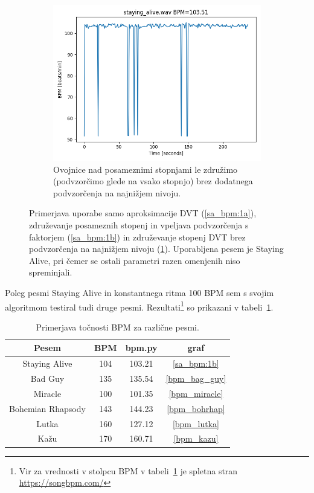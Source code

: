 \documentclass[a4paper,11pt]{article}
\begin{document}
\begin{figure}
\begin{subfigure}{0.48\textwidth}
\centering
\includegraphics[width=\linewidth]{images/sa_bpm_multiple_nosubs.png}
\caption{Ovojnice nad posameznimi stopnjami le združimo (podvzorčimo glede na vsako stopnjo) brez dodatnega podvzorčenja na najnižjem nivoju.} \label{sa_bpm:1c}
\end{subfigure}

\caption{Primerjava uporabe samo aproksimacije DVT (\ref{sa_bpm:1a}), združevanje posameznih stopenj in vpeljava podvzorčenja s faktorjem (\ref{sa_bpm:1b}) in združevanje stopenj DVT brez podvzorčenja na najnižjem nivoju (\ref{sa_bpm:1c}). Uporabljena pesem je Staying Alive, pri čemer se ostali parametri razen omenjenih niso spreminjali.} \label{sa_bpm_cmp}
\end{figure}


Poleg pesmi Staying Alive in konstantnega ritma 100 BPM sem s svojim algoritmom testiral tudi druge pesmi. Rezultati\footnote{Vir za vrednosti v stolpcu BPM v tabeli~\ref{tab:rezultati} je spletna stran \url{https://songbpm.com/}} so prikazani v tabeli~\ref{tab:rezultati}.

\begin{table}[!htpb]
\centering
\renewcommand{\arraystretch}{1.5}
 \begin{tabular}{||c c c c||} 
 \hline
 Pesem & BPM & bpm.py & graf \\ [0.5ex]
 \hline \hline
 Staying Alive & 104 & {\Large 103.21} & \ref{sa_bpm:1b} \\
 Bad Guy & 135 & {\Large 135.54 } & \ref{bpm_bag_guy} \\
 Miracle & 100 & {\Large 101.35} & \ref{bpm_miracle} \\
 Bohemian Rhapsody & 143 & {\Large 144.23} & \ref{bpm_bohrhap} \\
 Lutka & 160 & {\Large 127.12} & \ref{bpm_lutka} \\
 Kažu & 170 & {\Large 160.71} & \ref{bpm_kazu} \\
 \hline
 
\end{tabular}
\caption{\label{tab:rezultati}Primerjava točnosti BPM za različne pesmi.}
\end{table}
\end{document}
